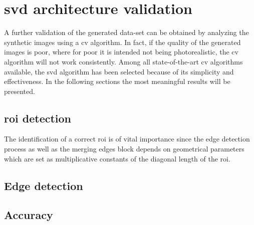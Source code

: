 \section{\acrshort{svd} architecture validation}
A further validation of the generated data-set can be obtained by analyzing the synthetic images using a \acrshort{cv} algorithm. In fact, if the quality of the generated images is poor, where for poor it is intended not being photorealistic, the \acrshort{cv} algorithm will not work consistently. Among all state-of-the-art \acrshort{cv} algorithms available, the \acrshort{svd} algorithm has been selected because of its simplicity and effectiveness. In the following sections the most meaningful results will be presented.

\subsection{\acrshort{roi} detection}
The identification of a correct \acrshort{roi} is of vital importance since the edge detection process as well as the merging edges block depends on geometrical parameters which are set as multiplicative constants of the diagonal length of the \acrshort{roi}.

\subsection{Edge detection}

\subsection{Accuracy}